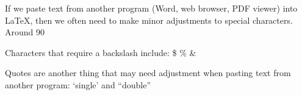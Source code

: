 \documentclass{article}
\begin{document}
If we paste text from another program (Word, web browser, PDF viewer) into \LaTeX, then we often need to make minor adjustments to special characters. Around 90%

Characters that require a backslash include: \$ \% \&

Quotes are another thing that may need adjustment when pasting text from another program: `single' and ``double''
\end{document}
